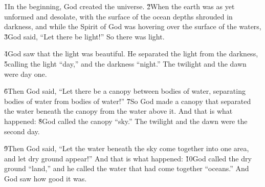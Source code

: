 


\v{1}In the beginning, God created the universe. \v{2}When the earth was as yet unformed and desolate, with the surface of the ocean depths shrouded in darkness, and while the Spirit of God was hovering over the surface of the waters, \v{3}God said, ``Let there be light!'' So there was light.

\v{4}God saw that the light was beautiful. He separated the light from the darkness, \v{5}calling the light ``day,'' and the darkness ``night.'' The twilight and the dawn were day one.

\v{6}Then God said, ``Let there be a canopy between bodies of water, separating bodies of water from bodies of water!'' \v{7}So God made a canopy that separated the water beneath the canopy from the water above it. And that is what happened: \v{8}God called the canopy ``sky.'' The twilight and the dawn were the second day.

\v{9}Then God said, ``Let the water beneath the sky come together into one area, and let dry ground appear!'' And that is what happened: \v{10}God called the dry ground ``land,'' and he called the water that had come together ``oceans.'' And God saw how good it was.

